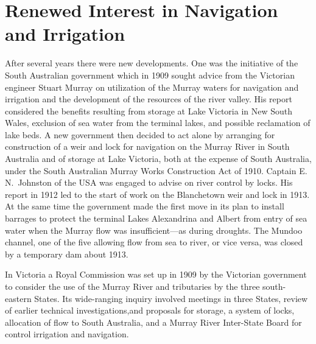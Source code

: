 \section*{Renewed Interest in Navigation and Irrigation}

After several years there were new developments. One was the
initiative of the South Australian government which in 1909 sought
advice from the Victorian engineer Stuart Murray on utilization of the
Murray waters for navigation and irrigation and the development of the
resources of the river valley.  His report considered the benefits
resulting from storage at Lake Victoria in New South Wales, exclusion
of sea water from the terminal lakes, and possible reclamation of lake
beds.  A new government then decided to act alone by arranging for
construction of a weir and lock for navigation on the Murray River in
South Australia and of storage at Lake Victoria, both at the expense
of South Australia, under the South Australian Murray Works
Construction Act of 1910.  Captain E.\,N.~Johnston of the USA was
engaged to advise on river control by locks.  His report in 1912 led
to the start of work on the Blanchetown weir and lock in 1913.  At the
same time the government made the first move in its plan to install
barrages to protect the terminal Lakes Alexandrina and Albert from
entry of sea water when the Murray flow was insufficient---as during
droughts.  The Mundoo channel, one of the five allowing flow from sea
to river, or vice versa, was closed by a temporary dam about
1913.

In Victoria a Royal Commission was set up in 1909 by the Victorian
government to consider the use of the Murray River and tributaries by
the three south-eastern States.  Its wide-ranging inquiry involved
meetings in three States, review of earlier technical
investigations,and proposals for storage, a system of locks,
allocation of flow to South Australia, and a Murray River Inter-State
Board for control irrigation and navigation.

